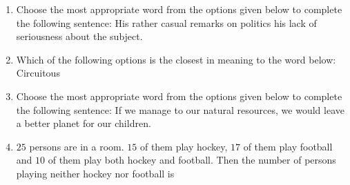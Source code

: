 \documentclass[journal,12pt,onecolumn]{IEEEtran}
\theoremstyle{remark}
\begin{document}
\begin{enumerate}
\item Choose the most appropriate word from the options given below to complete the following sentence:
His rather casual remarks on politics \underline{\hspace{2cm}} his lack of seriousness about the subject.
\hfill{}
\begin{enumerate}
\end{enumerate}

\item Which of the following options is the closest in meaning to the word below:
Circuitous
\hfill{}
\begin{enumerate}
\end{enumerate}

\item Choose the most appropriate word from the options given below to complete the following sentence:
If we manage to \underline{\hspace{2cm}} our natural resources, we would leave a better planet for our children.
\hfill{}
\begin{enumerate}
\end{enumerate}

\item $25$ persons are in a room. $15$ of them play hockey, $17$ of them play football and $10$ of them play both hockey and football. Then the number of persons playing neither hockey nor football is
\hfill{}
\begin{enumerate}
\end{enumerate}


\end{enumerate}
\end{document}
